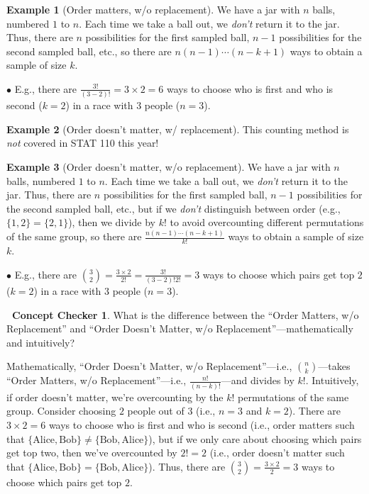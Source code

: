 \documentclass[12pt,oneside]{article}
\theoremstyle{definition}
\newtheorem{example}{Example}
\newtheorem{concept}{\faPen \ Concept Checker}
\theoremstyle{remark}
\begin{document}
\begin{example}[Order matters, w/o replacement]
We have a jar with $n$ balls, numbered $1$ to $n$. Each time we take a ball out, we \textit{don't} return it to the jar. Thus, there are $n$ possibilities for the first sampled ball, $n - 1$ possibilities for the second sampled ball, etc., so there are $n(n - 1) \cdots (n - k + 1)$ ways to obtain a sample of size $k$.

$\bullet$ E.g., there are $\frac{3!}{(3 - 2)!} = 3 \times 2 = 6$ ways to choose who is first and who is second ($k = 2$) in a race with $3$ people ($n = 3$).
\end{example}

\begin{example}[Order doesn't matter, w/ replacement]
This counting method is \textit{not} covered in STAT 110 this year!
\end{example}

\begin{example}[Order doesn't matter, w/o replacement]
We have a jar with $n$ balls, numbered $1$ to $n$. Each time we take a ball out, we \textit{don't} return it to the jar. Thus, there are $n$ possibilities for the first sampled ball, $n - 1$ possibilities for the second sampled ball, etc., but if we \textit{don't} distinguish between order (e.g., $\{1, 2\} = \{2, 1\}$), then we divide by $k!$ to avoid overcounting different permutations of the same group, so there are $\frac{n(n - 1) \cdots (n - k + 1)}{k!}$ ways to obtain a sample of size $k$.

$\bullet$ E.g., there are $\binom{3}{2} = \frac{3 \times 2}{2!} = \frac{3!}{(3 - 2)! 2!} = 3$ ways to choose which pairs get top $2$ ($k = 2$) in a race with $3$ people ($n = 3$).
\end{example}

\begin{concept}
What is the difference between the \enquote{Order Matters, w/o Replacement} and \enquote{Order Doesn't Matter, w/o Replacement}—mathematically and intuitively?
\end{concept}

\begin{solutionbox}
Mathematically, \enquote{Order Doesn't Matter, w/o Replacement}—i.e., $\binom{n}{k}$—takes \enquote{Order Matters, w/o Replacement}—i.e., $\frac{n!}{(n - k)!}$—and divides by $k!$. Intuitively, if order doesn't matter, we're overcounting by the $k!$ permutations of the same group. Consider choosing $2$ people out of $3$ (i.e., $n = 3$ and $k = 2$). There are $3 \times 2 = 6$ ways to choose who is first and who is second (i.e., order matters such that $\{\text{Alice}, \text{Bob}\} \neq \{\text{Bob}, \text{Alice}\}$), but if we only care about choosing which pairs get top two, then we've overcounted by $2! = 2$ (i.e., order doesn't matter such that $\{\text{Alice}, \text{Bob}\} = \{\text{Bob}, \text{Alice}\}$). Thus, there are $\binom{3}{2} = \frac{3 \times 2}{2} = 3$ ways to choose which pairs get top $2$.
\end{solutionbox}
\end{document}
